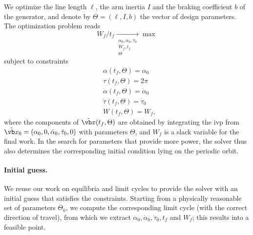 We optimize the line length \(\ell\), the arm inertia \(I\) and the braking coefficient \(b\) of the generator, and denote by \(\Theta = (\ell, I, b)\) the vector of design parameters.
The optimization problem reads
\begin{equation} \label{eq:opt-problem}
W_f / t_f \underset{\substack{\alpha_0, \dot{\alpha}_0, \dot{\tau}_0 \\ W_f, t_f \\ \Theta}}{\longrightarrow} \max
\end{equation}
subject to constraints
\begin{equation} \label{eq:opt-constraints}
\begin{split}
    &\alpha(t_f, \Theta) = \alpha_0 \\
    &\tau(t_f, \Theta) = 2\pi \\
    &\dot \alpha(t_f, \Theta) = \dot \alpha_0 \\
    &\dot \tau(t_f, \Theta) = \dot \tau_0 \\
    &W(t_f, \Theta) = W_f,
\end{split}
\end{equation}
where the components of \(\tilde{\vb x}(t_f, \Theta)\) are obtained by integrating the \ac{ivp} from \(\tilde{\vb x}_0 = (\alpha_0, 0, \dot \alpha_0, \dot \tau_0, 0)\) with parameters \(\Theta\), and \(W_f\) is a slack variable for the final work.
In the search for parameters that provide more power, the solver thus also determines the corresponding initial condition lying on the periodic orbit.

\paragraph{Initial guess.}
We reuse our work on equilibria and limit cycles to provide the solver with an initial guess that satisfies the constraints.
Starting from a physically reasonable set of parameters \(\Theta_0\), we compute the corresponding limit cycle (with the correct direction of travel), from which we extract \(\alpha_0, \dot \alpha_0, \dot \tau_0, t_f\) and \(W_f\); this results into a feasible point.

